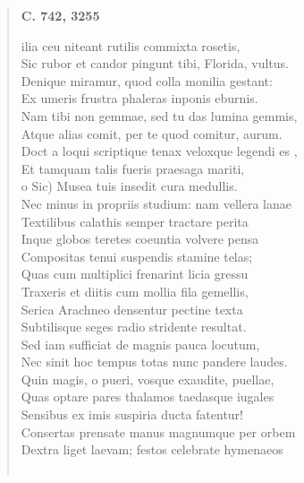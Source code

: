 \documentclass[11pt, a4paper]{report}
\begin{document}
\begin{verse}
     \marginpar{[227]} \begin{center} \textbf{C. 742, 3255} \end{center}ilia ceu niteant rutilis commixta rosetis, \\ Sic rubor et candor pingunt tibi, Florida, vultus. \\ Denique miramur, quod colla monilia gestant: \\ Ex umeris frustra phaleras inponis eburnis. \\ Nam tibi non gemmae, sed tu das lumina gemmis, \\ Atque alias comit, per te quod comitur, aurum. \\  \lbrack Doct \rbrack a loqui scriptique tenax veloxque legendi  \lbrack es \rbrack , \\  \lbrack Et tamquam talis fueris praesaga mariti, \\ o  \lbrack Sic) \rbrack  Musea tuis insedit cura medullis. \\ Nec minus in propriis studium: nam vellera lanae \\ Textilibus calathis semper tractare perita \\ Inque globos teretes coeuntia volvere pensa \\ Compositas tenui suspendis stamine telas; \\ Quas cum multiplici frenarint licia gressu \\ Traxeris et diitis cum mollia fila gemellis, \\ Serica Arachneo densentur pectine texta \\ Subtilisque seges radio stridente resultat. \\ Sed iam sufficiat de magnis pauca locutum, \\ Nec sinit hoc tempus totas nunc pandere laudes. \\ Quin magis, o pueri, vosque exaudite, puellae, \\ Quas optare pares thalamos taedasque iugales \\ Sensibus ex imis suspiria ducta fatentur! \\ Consertas prensate manus magnumque per orbem \\ Dextra liget laevam; festos celebrate hymenaeos \\ 
        ﻿\pagebreak 

\end{verse}
\end{document}
